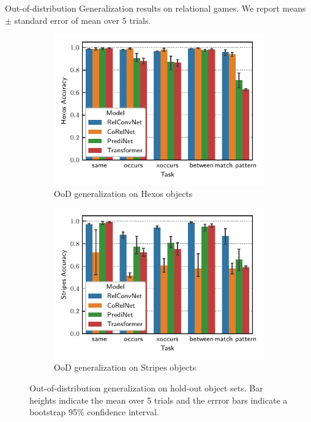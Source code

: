 \begin{table}
    \centering
    
    \caption{Out-of-distribution Generalization results on relational games. We report means $\pm$ standard error of mean over 5 trials.}\label{tab:ood_generalization}

\end{table}

\begin{figure}
    \begin{subfigure}{0.5\textwidth}
        \centering
        \includegraphics[width=\textwidth]{figs/experiments/hexos_acc.pdf}
        \caption{OoD generalization on Hexos objects}\label{fig:ood_generalization_hexos}
    \end{subfigure}
    \begin{subfigure}{0.5\textwidth}
        \centering
        \includegraphics[width=\textwidth]{figs/experiments/stripes_acc.pdf}
        \caption{OoD generalization on Stripes objects}\label{fig:ood_generalization_stripes}
    \end{subfigure}
    \caption{Out-of-distribution generalization on hold-out object sets. Bar heights indicate the mean over 5 trials and the errror bars indicate a bootstrap 95\% confidence interval.}\label{fig:ood_generalization}
\end{figure}


